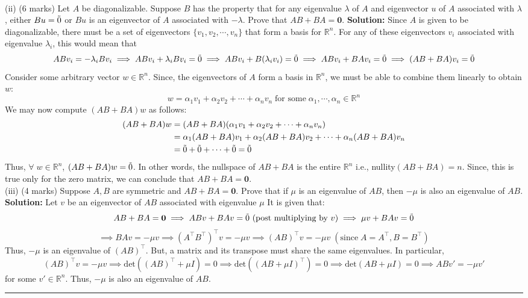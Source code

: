 \documentclass{article}
\begin{document}
\newline
\\ (ii) (6 marks) Let $A$ be diagonalizable. Suppose $B$ has the property that for any eigenvalue $\lambda$ of $A$ and eigenvector $u$ of $A$ associated with $\lambda$, either $Bu = \Tilde{0}$ or $Bu$ is an eigenvector of $A$ associated with $-\lambda$. Prove that $AB + BA = \bm{0}$.
\newline
\textbf{Solution:}
Since $A$ is given to be diagonalizable, there must be a set of eigenvectors $\{ v_1, v_2, \cdots, v_n \}$ that form a basis for $\mathbb{R}^n$. For any of these eigenvectors $v_i$ associated with eigenvalue $\lambda_i$, this would mean that
$$ABv_i = -\lambda_i Bv_i \implies ABv_i + \lambda_i Bv_i = \Tilde{0} \implies ABv_i + B (\lambda_i v_i) = \Tilde{0} \implies ABv_i + BAv_i = \Tilde{0} \implies (AB + BA)v_i = \Tilde{0}$$
Consider some arbitrary vector $w \in \mathbb{R}^n$. Since, the eigenvectors of $A$ form a basis in $\mathbb{R}^n$, we must be able to combine them linearly to obtain $w$:
$$w = \alpha_1 v_1 + \alpha_2 v_2 + \cdots + \alpha_n v_n \; \text{for some} \; \alpha_1, \cdots, \alpha_n \in \mathbb{R}^n$$
We may now compute $(AB + BA)w$ as follows:
\begin{align*}
    (AB + BA)w &= (AB + BA)(\alpha_1 v_1 + \alpha_2 v_2 + \cdots + \alpha_n v_n) \\
    &= \alpha_1 (AB + BA) v_1 + \alpha_2 (AB + BA) v_2 + \cdots + \alpha_n (AB + BA) v_n \\
    &= \Tilde{0} + \Tilde{0} + \cdots + \Tilde{0} = \Tilde{0}
\end{align*}
Thus, $\forall \; w \in \mathbb{R}^n$, $(AB + BA)w = \Tilde{0}$. In other words, the nullspace of $AB + BA$ is the entire $\mathbb{R}^n$ i.e., nullity$(AB + BA) = n$. Since, this is true only for the zero matrix, we can conclude that $AB + BA = \bm{0}$.
\newline
\\ (iii) (4 marks) Suppose $A, B$ are symmetric and $AB + BA = \bm{0}$. Prove that if $\mu$ is an eigenvalue of $AB$, then $-\mu$ is also an eigenvalue of $AB$.
\newline
\textbf{Solution:}
Let $v$ be an eigenvector of $AB$ associated with eigenvalue $\mu$ It is given that:
$$AB + BA = \bm{0} \implies AB v + BA v = \Tilde{0} \text{ (post multiplying by } v \text{)}  \implies \mu v + BA v = \Tilde{0} $$
$$ \implies BA v = - \mu v \implies (A^\top B^\top)^\top v = - \mu v \implies (AB)^\top v = - \mu v \; (\text{since} \; A = A^\top, B = B^\top)$$
Thus, $-\mu$ is an eigenvalue of $(AB)^\top$. But, a matrix and its transpose must share the same eigenvalues. In particular,
$$(AB)^\top v = - \mu v \implies \text{det}((AB)^\top + \mu I) = 0 \implies \text{det}((AB  + \mu I)^\top) = 0 \implies \text{det}(AB  + \mu I) = 0 \implies AB v' = - \mu v'$$
for some $v' \in \mathbb{R}^n$. Thus, $-\mu$ is also an eigenvalue of $AB$.

\newline
\vspace{5pt}
\hrule
\end{document}
